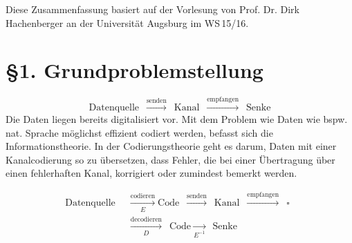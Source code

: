 \documentclass{cheat-sheet}
\begin{document}
\raggedcolumns %


Diese Zusammenfassung basiert auf der Vorlesung von Prof. Dr. Dirk Hachenberger an der Universität Augsburg im WS\,15/16.


\section{§1. Grundproblemstellung}


\[
  \text{Datenquelle} \enspace
  \xrightarrow{\text{senden}} \enspace
  \text{Kanal} \enspace
  \xrightarrow{\text{empfangen}} \enspace
  \text{Senke}
\]
Die Daten liegen bereits digitalisiert vor.
Mit dem Problem wie Daten wie bspw. nat. Sprache möglichst effizient codiert werden, befasst sich die Informationstheorie.
In der Codierungstheorie geht es darum, Daten mit einer Kanalcodierung so zu übersetzen, dass Fehler, die bei einer Übertragung über einen fehlerhaften Kanal, korrigiert oder zumindest bemerkt werden.

%


\begin{align*}
  \text{Datenquelle} \enspace
  & \xrightarrow[E]{\text{codieren}}
  \text{Code} \enspace
  \xrightarrow{\text{senden}} \enspace
  \text{Kanal} \enspace
  \xrightarrow{\text{empfangen}} \enspace
  \square \enspace \\
  & \xrightarrow[D]{\text{decodieren}} \enspace
  \text{Code}
  \xrightarrow[E^{-1}]{} \enspace
  \text{Senke}
\end{align*}



\end{document}
